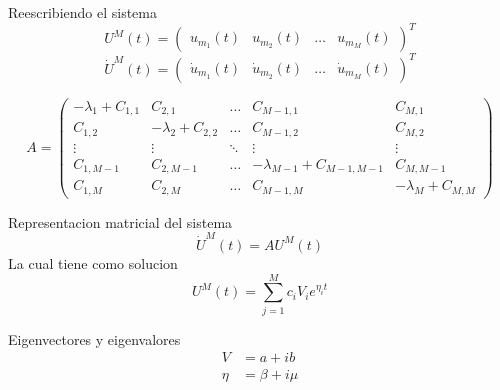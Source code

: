 \begin{frame}	
	Reescribiendo el sistema
	\begin{equation*}
		U^M (t) =
		\begin{pmatrix}
		u_{m_1} (t) & u_{m_2} (t) & \dots & u_{m_M} (t)
		\end{pmatrix}^T   
	\end{equation*}
	\begin{equation*}
		\dot{U}^M (t) =
		\begin{pmatrix}
		\dot{u}_{m_1} (t) & \dot{u}_{m_2} (t) & \dots & \dot{u}_{m_M} (t)
		\end{pmatrix}^T   
	\end{equation*}
	
	\begin{equation*}
		A =
		\begin{pmatrix}
		-\lambda_1 + C_{1,1} & C_{2,1} & \dots & C_{M-1,1} & C_{M,1} 
		\\
		C_{1,2} & -\lambda_2 + C_{2,2} & \dots & C_{M-1,2} & C_{M,2}  
		\\
		\vdots & \vdots & \ddots & \vdots & \vdots
		\\
		C_{1,M-1} & C_{2,M-1} & \dots & -\lambda_{M-1} + C_{M-1,M-1} & C_{M,M-1} 
		\\
		C_{1,M} & C_{2,M} & \dots & C_{M-1,M} & -\lambda_{M} + C_{M,M} 
		\end{pmatrix}
	\end{equation*}
\end{frame}
	
\begin{frame}
	Representacion matricial del sistema
	\begin{equation*}
		\dot{U}^M (t) = AU^M (t)
	\end{equation*}
	La cual tiene como solucion
	\begin{equation*}
		U^M (t) = \displaystyle \sum _{j = 1}^{M} c_i V_i e^{\eta_i t}
	\end{equation*}
	
	Eigenvectores y eigenvalores
	\begin{align*}
		V &= a + i b \\
		\eta &= \beta + i \mu
	\end{align*}
\end{frame}

